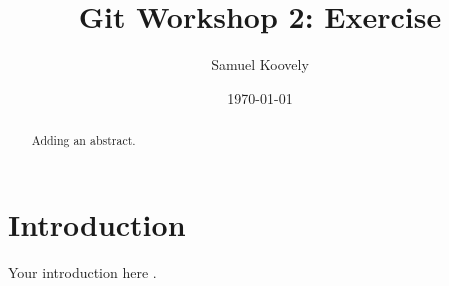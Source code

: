 \documentclass{article}
\title{Git Workshop 2: Exercise}
\author{Samuel Koovely}
\date{\today}
\begin{document}
\maketitle

\begin{abstract}
Adding an abstract.
\end{abstract}

\section{Introduction}
Your introduction here \cite{example}.



\end{document}
